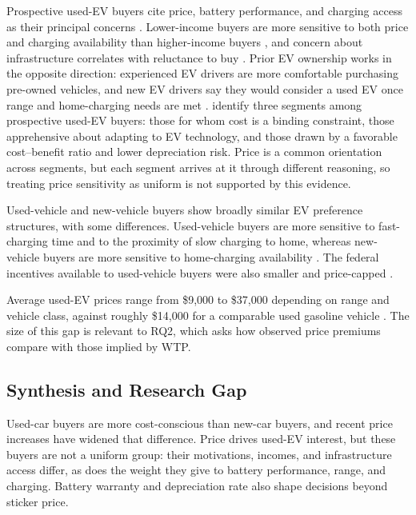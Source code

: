 \documentclass[a4paper,fleqn]{cas-sc}   %
\begin{document}
Prospective used-EV buyers cite price, battery performance, and charging access as their principal concerns \parencite{trd2024usedEV_concerns}. Lower-income buyers are more sensitive to both price and charging availability than higher-income buyers \parencite{trd2024usedEV_concerns}, and concern about infrastructure correlates with reluctance to buy \parencite{trd2024usedEV_adoption}. Prior EV ownership works in the opposite direction: experienced EV drivers are more comfortable purchasing pre-owned vehicles, and new EV drivers say they would consider a used EV once range and home-charging needs are met \parencite{trd2024usedEV_adoption}. \textcite{tandf2025usedEV} identify three segments among prospective used-EV buyers: those for whom cost is a binding constraint, those apprehensive about adapting to EV technology, and those drawn by a favorable cost--benefit ratio and lower depreciation risk. Price is a common orientation across segments, but each segment arrives at it through different reasoning, so treating price sensitivity as uniform is not supported by this evidence.

Used-vehicle and new-vehicle buyers show broadly similar EV preference structures, with some differences. Used-vehicle buyers are more sensitive to fast-charging time and to the proximity of slow charging to home, whereas new-vehicle buyers are more sensitive to home-charging availability \parencite{sagepub2020EVattributes, khaloeiHowDoesCharging2020}. The federal incentives available to used-vehicle buyers were also smaller and price-capped \parencite{tandf2025usedEV}.

Average used-EV prices range from \$9,000 to \$37,000 depending on range and vehicle class, against roughly \$14,000 for a comparable used gasoline vehicle \parencite{konstantinou2024usedEV_price}. The size of this gap is relevant to RQ2, which asks how observed price premiums compare with those implied by WTP.

\subsection{Synthesis and Research Gap}

Used-car buyers are more cost-conscious than new-car buyers, and recent price increases have widened that difference. Price drives used-EV interest, but these buyers are not a uniform group: their motivations, incomes, and infrastructure access differ, as does the weight they give to battery performance, range, and charging. Battery warranty and depreciation rate also shape decisions beyond sticker price.
\end{document}
